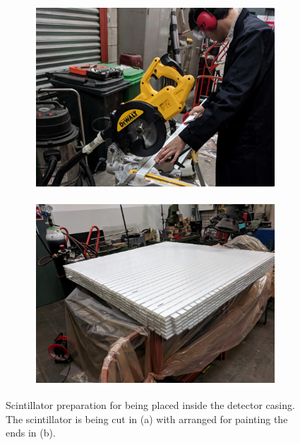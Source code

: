 \begin{figure}[!h]
\centering
\begin{subfigure}{.5\textwidth}
  \centering
  \includegraphics[width=\linewidth]{Chapter3/Figs/Raster/detCon003bb_CuttingScint.png}
  \captionsetup{width=.9\linewidth}
  \caption{}
  \label{subFig:detCon003bb_CuttingScint}
\end{subfigure}%
\begin{subfigure}{.5\textwidth}
  \centering
  \includegraphics[width=\linewidth]{Chapter3/Figs/Raster/detCon005b_PaintingEnds.png}
  \captionsetup{width=.9\linewidth}
  \caption{}
  \label{subFig:detCon005b_PaintingEnds}
\end{subfigure}
\caption{Scintillator preparation for being placed inside the detector casing. The scintillator is being cut in (a) with arranged for painting the ends in (b).}
\label{fig:detCon_CuttingScint_PaintingEnds}
\end{figure}


